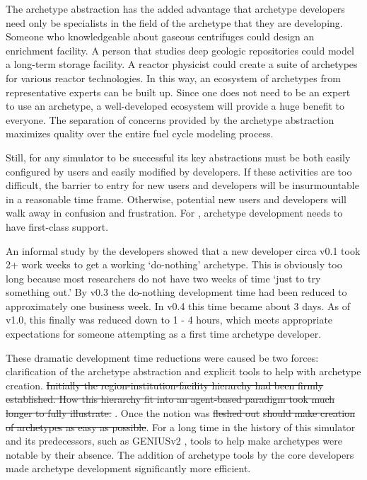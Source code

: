 The archetype abstraction has the added advantage that archetype developers 
need only be specialists in the field of the archetype that they are developing.
Someone who knowledgeable about gaseous centrifuges could design 
an enrichment facility. A person that studies deep geologic repositories
could model a long-term storage facility. A reactor physicist could create 
a suite of archetypes for various reactor technologies. In this way, an ecosystem 
of archetypes from representative experts can be built up. Since one does not need
to be an expert to use an archetype, a well-developed ecosystem will provide 
a huge benefit to everyone. The separation of concerns provided by the archetype 
abstraction maximizes quality over the entire fuel cycle modeling process.

Still, for any simulator to be successful its key abstractions must be both easily 
configured by users and easily modified by developers.  If these activities are 
too difficult, the barrier to entry for new users and developers will be 
insurmountable in a reasonable time frame. Otherwise, potential new users and developers will 
walk away in confusion and frustration. For \cyclus, archetype development
needs to have first-class support.

An informal study 
by the developers showed that a new developer circa \cyclus v0.1
took 2+ work weeks to get a working `do-nothing' archetype. This is obviously 
too long because most researchers do not have two weeks of time `just to try 
something out.' By \cyclus v0.3 the do-nothing development time had been reduced 
to approximately one business week. In \cyclus v0.4 this time became about 3 days.
As of \cyclus v1.0, this finally was reduced down to 1 - 4 hours, which meets
appropriate expectations for someone attempting \cyclus as a first time archetype 
developer.

These dramatic development time reductions were caused be two forces:
clarification of the archetype abstraction and explicit tools to help with 
archetype creation. \sout{Initially the region-institution-facility hierarchy 
had been firmly established. How this hierarchy fit into an agent-based 
paradigm took much longer to fully illustrate.} .  Once the notion was \sout{fleshed out} 
\sout{\Cyclus should make creation of archetypes as easy as possible}. 
For a long time in the history of this simulator and its predecessors, such as 
\gls{GENIUSv2} , tools to help make archetypes were notable by their 
absence. 
The addition of archetype tools by the \cyclus core developers made archetype
development significantly more efficient.

